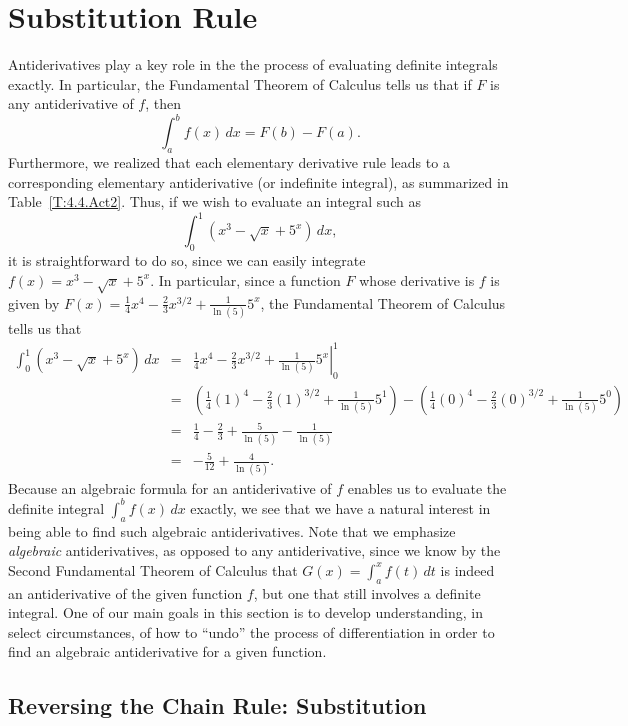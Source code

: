 \section{Substitution Rule}\label{sec:SubRule}



Antiderivatives play a key role in the the process of evaluating definite integrals exactly.  In particular, the Fundamental Theorem of Calculus tells us that if $F$ is any antiderivative of $f$, then
$$\int_a^b f(x) \, dx = F(b) - F(a).$$
Furthermore, we realized that each elementary derivative rule leads to a corresponding elementary antiderivative (or indefinite integral), as summarized in Table~\ref{T:4.4.Act2}.  Thus, if we wish to evaluate an integral such as 
$$\int_0^1 \left(x^3 - \sqrt{x} + 5^x \right) \,dx,$$
it is straightforward to do so, since we can easily integrate $f(x) = x^3 - \sqrt{x} + 5^x.$ In particular, since a function $F$ whose derivative is $f$ is given by $F(x) = \frac{1}{4}x^4 - \frac{2}{3}x^{3/2} + \frac{1}{\ln(5)}5^x$, the Fundamental Theorem of Calculus tells us that
\begin{eqnarray*}
\int_0^1 \left(x^3 - \sqrt{x} + 5^x\right) \,dx & = & \left. \frac{1}{4}x^4 - \frac{2}{3}x^{3/2} + \frac{1}{\ln(5)}5^x\right|_0^1 \\
								& = & \left( \frac{1}{4}(1)^4 - \frac{2}{3}(1)^{3/2} + \frac{1}{\ln(5)}5^1 \right) - \left( \frac{1}{4}(0)^4 - \frac{2}{3}(0)^{3/2} + \frac{1}{\ln(5)}5^0 \right) \\
								& = & \frac{1}{4} - \frac{2}{3} + \frac{5}{\ln(5)} - \frac{1}{\ln(5)} \\
								& = & -\frac{5}{12} + \frac{4}{\ln(5)}.
\end{eqnarray*}
Because an algebraic formula for an antiderivative of $f$ enables us to evaluate the definite integral $\int_a^b f(x) \, dx$ exactly, we see that we have a natural interest in being able to find such algebraic antiderivatives.  Note that we emphasize \emph{algebraic} antiderivatives, as opposed to any antiderivative, since we know by the Second Fundamental Theorem of Calculus that $G(x) = \int_a^x f(t) \, dt$ is indeed an antiderivative of the given function $f$, but one that still involves a definite integral.  One of our main goals in this section is to develop understanding, in select circumstances, of how to ``undo'' the process of differentiation in order to find an algebraic antiderivative for a given function.


\subsection*{Reversing the Chain Rule: Substitution} 

